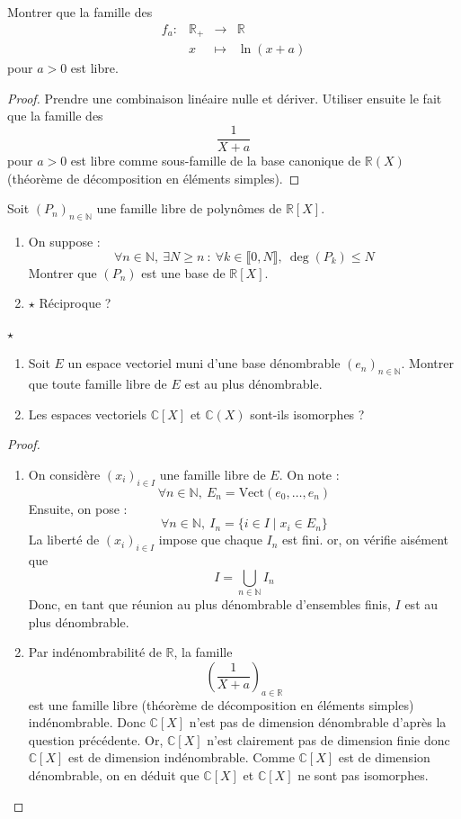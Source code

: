 \documentclass[french,a4paper]{article}
\newcommand{\N}{\mathbb{N}}
\newcommand{\R}{\mathbb{R}}
\newcommand{\C}{\mathbb{C}}
\theoremstyle{plain}
\theoremstyle{definition}
\theoremstyle{remark}
\begin{document}
\begin{ex}[Moulin.EV.12]{}
	Montrer que la famille des $$\begin{array}{lrcl}
		f_a:&\R_+&\longrightarrow&\R \\
		&x&\longmapsto&\ln(x+a)
	\end{array}$$ pour $a>0$ est libre.
\end{ex}
\begin{proof}
	Prendre une combinaison linéaire nulle et dériver. Utiliser ensuite le fait que la famille des $$\frac{1}{X+a}$$ pour $a>0$ est libre comme sous-famille de la base canonique de $\R(X)$ (théorème de décomposition en éléments simples).
\end{proof}

\begin{ex}[Moulin.EV.13]{}
	Soit $(P_n)_{n\in\N}$ une famille libre de polynômes de $\R[X]$.
	\begin{enumerate}
		\item On suppose : $$\forall n\in\N,\ \exists N\geqslant n\ :\ \forall k\in\llbracket0,N\rrbracket,\ \deg(P_k)\leqslant N$$ Montrer que $(P_n)$ est une base de $\R[X]$.
		\item $\star$ Réciproque ?
	\end{enumerate}
\end{ex}

\begin{ex}[Moulin.EV.14]{$\star$}
	\begin{enumerate}
		\item Soit $E$ un espace vectoriel muni d'une base dénombrable $(e_n)_{n\in\N}$. Montrer que toute famille libre de $E$ est au plus dénombrable.
		\item Les espaces vectoriels $\C[X]$ et $\C(X)$ sont-ils isomorphes ?
	\end{enumerate}
\end{ex}
\begin{proof}
	\begin{enumerate}
		\item On considère $(x_i)_{i\in I}$ une famille libre de $E$. On note : $$\forall n\in\N,\ E_n=\text{Vect}(e_0,\ldots,e_n)$$ Ensuite, on pose : $$\forall n\in\N,\ I_n=\{i\in I \mid x_i\in E_n\}$$ La liberté de $(x_i)_{i\in I}$ impose que chaque $I_n$ est fini. or, on vérifie aisément que $$I=\bigcup_{n\in\N} I_n$$ Donc, en tant que réunion au plus dénombrable d'ensembles finis, $I$ est au plus dénombrable.
		\item Par indénombrabilité de $\R$, la famille $$\left(\frac{1}{X+a}\right)_{a\in \R}$$ est une famille libre (théorème de décomposition en éléments simples) indénombrable. Donc $\C[X]$ n'est pas de dimension dénombrable d'après la question précédente. Or, $\C[X]$ n'est clairement pas de dimension finie donc $\C[X]$ est de dimension indénombrable. Comme $\C[X]$ est de dimension dénombrable, on en déduit que $\C[X]$ et $\C[X]$ ne sont pas isomorphes.
	\end{enumerate}
\end{proof}
\end{document}
